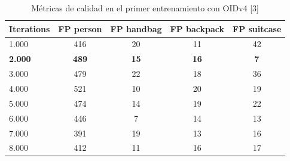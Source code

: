 \begin{table}[ht]
\centering
\caption{Métricas de calidad en el primer entrenamiento con OIDv4 [3]}
\label{tab:metricas-test1_3}
\begin{tabular}{lcccc}
\hline
\textbf{Iterations} & \textbf{FP person} & \textbf{FP handbag} & \textbf{FP backpack} & \textbf{FP suitcase} \\ \hline
1.000               & 416                & 20                  & 11                   & 42                   \\
\textbf{2.000}      & \textbf{489}       & \textbf{15}         & \textbf{16}          & \textbf{7}           \\
3.000               & 479                & 22                  & 18                   & 36                   \\
4.000               & 521                & 10                  & 20                   & 19                   \\
5.000               & 474                & 14                  & 19                   & 22                   \\
6.000               & 446                & 7                   & 14                   & 13                   \\
7.000               & 391                & 19                  & 13                   & 16                   \\
8.000               & 412                & 11                  & 16                   & 17                   \\ \hline
\end{tabular}
\end{table}

